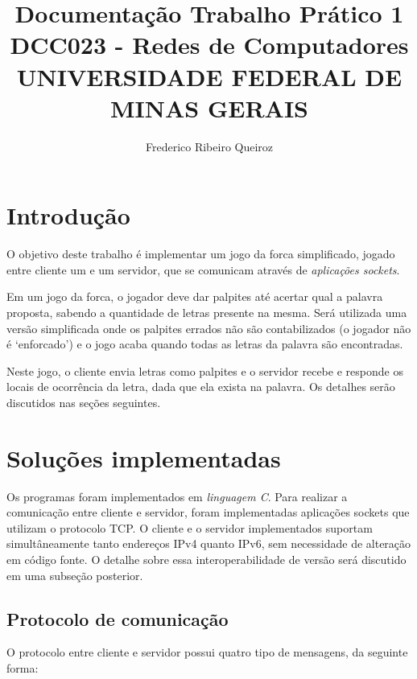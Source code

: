 \documentclass[12pt]{article}
\begin{document}
\title{%
    Documentação Trabalho Prático 1 \\
    \vspace{2em}
    \large DCC023 - Redes de Computadores \\
    UNIVERSIDADE FEDERAL DE MINAS GERAIS}

\author{Frederico Ribeiro Queiroz}
\maketitle

\section{Introdução}
O objetivo deste trabalho é implementar um jogo da forca simplificado, jogado entre cliente um
e um servidor, que se comunicam através de \emph{aplicações sockets}. \par
Em um jogo da forca, o jogador deve dar palpites até acertar qual a palavra proposta, sabendo a quantidade de letras presente na mesma.
Será utilizada uma versão simplificada onde os palpites errados não são contabilizados (o jogador não é `enforcado') e o jogo acaba quando todas as letras da palavra são encontradas. \par
Neste jogo, o cliente envia letras como palpites e o servidor recebe e responde os locais de ocorrência da letra, dada que ela exista na palavra.
Os detalhes serão discutidos nas seções seguintes.

\section{Soluções implementadas}
Os programas foram implementados em \emph{linguagem C}. Para realizar a comunicação entre cliente e servidor, foram implementadas aplicações sockets que utilizam o protocolo TCP.
O cliente e o servidor implementados suportam simultâneamente tanto endereços IPv4 quanto IPv6, sem necessidade de alteração em código fonte. 
O detalhe sobre essa interoperabilidade de versão será discutido em uma subseção posterior.\par

\subsection{Protocolo de comunicação}
O protocolo entre cliente e servidor possui quatro tipo de mensagens, da seguinte forma:
\end{document}

